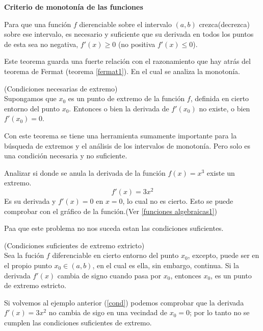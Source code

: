 \documentclass[10pt,twoside]{SelfArx} %
\begin{document}
   \begin{center}
\textbf{Criterio de monotonía de las funciones}
   \end{center}
   \begin{teorema}\label{Criteriomonoton}
   	Para que una función $ f $ dierenciable sobre el intervalo $ (a,b) $ crezca(decrezca) sobre ese intervalo, es necesario y suficiente que su derivada en todos los puntos de esta sea no negativa, $ f'(x)\geq0 $ (no positiva $ f'(x)\leq 0 $).
   \end{teorema}
    Este teorema guarda una fuerte relación con el razonamiento que hay atrás del teorema de Fermat (teorema \ref{fermat1}). En el cual se analiza la monotonía.
   \begin{teorema}
   	(Condiciones necesarias de extremo)\\
   	Supongamos que $ x_{0} $ es un punto de extremo de la funci\'on $ f $, definida en cierto entorno del punto $ x_{0} $. Entonces o bien la derivada de $ f'(x_{0}) $ no existe, o bien $ f'(x_{0})=0 $.
   \end{teorema}
   Con este teorema se tiene una herramienta sumamente importante para la búsqueda de extremos y el análisis de los intervalos de monotonía. Pero solo es una condición necesaria y no suficiente.
   \begin{ejemplo}\label{cond}
   	Analizar si donde se anula la derivada de la función $ f(x)=x^{3}$ existe un extremo.
   	\begin{equation}
   	f'(x)=3x^{2}
   	\end{equation}
   	Es su derivada y $ f'(x)=0 $ en $ x=0 $, lo cual no es cierto. Esto se puede comprobar con el gráfico de la función.(Ver \ref{funciones algebraicas1})
   \end{ejemplo}
   Paa que este problema no nos suceda estan las condiciones suficientes.
   \begin{teorema}\label{CondicioneSuficientExtremo}
   	(Condiciones suficientes de extremo extricto)\\
   	Sea la fución $ f $ diferenciable en cierto entorno del punto $ x_{0} $, excepto, puede ser en el propio punto $ x_{0}\in(a,b)  $, en el cual es ella, sin embargo, continua. Si la derivada $ f'(x) $ cambia de signo cuando pasa por $ x_{0} $, entonces $ x_{0} $, es un punto de extremo estricto.
   \end{teorema}
   Si volvemos al ejemplo anterior (\ref{cond}) podemos comprobar que la derivada $    	f'(x)=3x^{2} $ no cambia de sigo en una vecindad de $ x_{0}=0 $; por lo tanto no se cumplen las condiciones suficientes de extremo.\\
\end{document}
